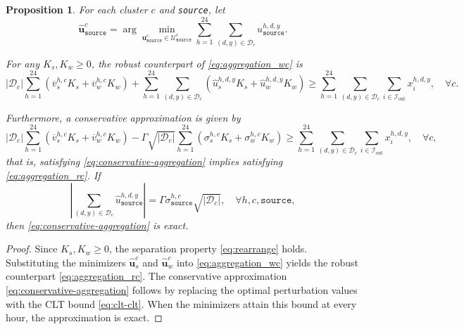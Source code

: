 \documentclass[11pt, letter]{article}
\newtheorem{proposition}[theorem]{Proposition}
\begin{document}
\begin{proposition}\label{prop:rc-aggregation}
For each cluster $c$ and \texttt{source}, let
\begin{equation}\label{eq:closed-form}
    \boldsymbol{\hat{u}}^{c}_\texttt{source}
    =
    \arg\min_{\boldsymbol{u}^{c}_\texttt{source}\in\mathcal{U}^{c}_\texttt{source}}
    \sum_{h=1}^{24}\sum_{(d,y)\in\mathcal{D}_c}
    u_\texttt{source}^{h,d,y}.
\end{equation}

For any $K_s,K_w \ge 0$, the robust counterpart of
\eqref{eq:aggregation_wc} is
\begin{equation}\label{eq:aggregation_rc}
   |\mathcal{D}_c|
   \sum_{h=1}^{24}
   \left(
   \overline{v}_s^{h,c}K_s
   +
   \overline{v}_w^{h,c}K_w
   \right)
   +
   \sum_{h=1}^{24}\sum_{(d,y)\in\mathcal{D}_c}
   \left(
   \hat{u}_s^{h,d,y}K_s
   +
   \hat{u}_w^{h,d,y}K_w
   \right)
   \ge
   \sum_{h=1}^{24}\sum_{(d,y)\in\mathcal{D}_c}
   \sum_{i\in\mathcal{I}_{\mathrm{out}}}
   x_i^{h,d,y},
   \quad \forall c.
\end{equation}

Furthermore, a conservative approximation is given by
\begin{equation}\label{eq:conservative-aggregation}
    |\mathcal{D}_c|
    \sum_{h=1}^{24}
    \left(
    \overline{v}_s^{h,c}K_s
    +
    \overline{v}_w^{h,c}K_w
    \right)
    -
    \Gamma\sqrt{|\mathcal{D}_c|}
    \sum_{h=1}^{24}
    \left(
    \sigma_s^{h,c}K_s
    +
    \sigma_w^{h,c}K_w
    \right)
    \ge
    \sum_{h=1}^{24}\sum_{(d,y)\in\mathcal{D}_c}
    \sum_{i\in\mathcal{I}_{\mathrm{out}}}
    x_i^{h,d,y},
    \quad \forall c,
\end{equation}
that is, satisfying \eqref{eq:conservative-aggregation} implies satisfying \eqref{eq:aggregation_rc}. If
\[
\left|
\sum_{(d,y)\in\mathcal{D}_c}
\hat{u}^{h,d,y}_{\texttt{source}}
\right|
=
\Gamma
\sigma^{h,c}_{\texttt{source}}
\sqrt{|\mathcal{D}_c|},
\quad
\forall h,c,\texttt{source},
\]
then \eqref{eq:conservative-aggregation} is exact.
\end{proposition}

\begin{proof}
Since $K_s,K_w \ge 0$, the separation property
\eqref{eq:rearrange} holds. Substituting the minimizers
$\hat{\boldsymbol{u}}_s^c$ and $\hat{\boldsymbol{u}}_w^c$
into \eqref{eq:aggregation_wc} yields the robust counterpart
\eqref{eq:aggregation_rc}. The conservative approximation
\eqref{eq:conservative-aggregation} follows by replacing the optimal
perturbation values with the CLT bound \eqref{eq:clt-clt}. When the
minimizers attain this bound at every hour, the approximation is exact.
\end{proof}
\end{document}
